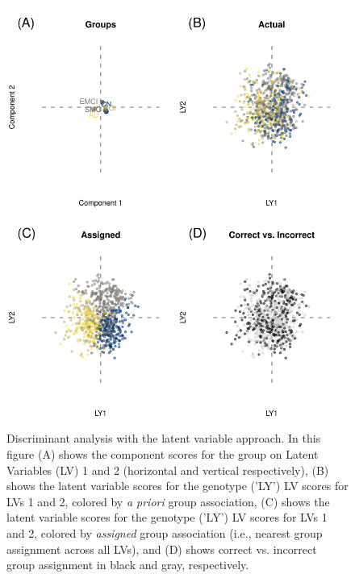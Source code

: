 \documentclass[12pt]{article}
\begin{document}
\begin{figure}[!hbtp]

{\centering \includegraphics[width=.8\textwidth,height=.8\textheight]{PLSCAR_to_a_GPLS_files/figure-latex/unnamed-chunk-6-1} 

}

\caption{\label{fig:discriminant_ex1} Discriminant analysis with the latent variable approach. In this figure (A) shows the component scores for the group on Latent Variables (LV) 1 and 2 (horizontal and vertical respectively), (B) shows the latent variable scores for the genotype ('LY') LV scores for LVs 1 and 2, colored by \textit{a priori} group association, (C) shows the latent variable scores for the genotype ('LY') LV scores for LVs 1 and 2, colored by \textit{assigned} group association (i.e., nearest group assignment across all LVs), and (D) shows correct vs. incorrect group assignment in black and gray, respectively.}\label{fig:unnamed-chunk-6}
\end{figure}
\end{document}
